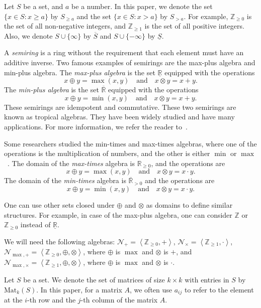 \documentclass[reqno,12pt]{amsart}
\theoremstyle{definition}
\newcommand{\Mat}{\mathrm{Mat}}
\newcommand{\ZMP}{\mathcal{N}_{\max, {+}}}
\newcommand{\ZMT}{\mathcal{N}_{\max, {\times}}}
\newcommand{\ZP}{\mathcal{N}_{+}}
\newcommand{\ZT}{\mathcal{N}_{\times}}
\begin{document}
Let $S$ be a set, and $a$ be a number. In this paper, we denote the set $\{x \in S : x \geq a\}$ by $S_{\geq a}$ and the set $\{x \in S : x > a\}$ by $S_{> a}$. For example, $\mathbb{Z}_{\geq 0}$ is the set of all non-negative integers, and $\mathbb{Z}_{\geq 1}$ is the set of all positive integers.
Also, we denote $S \cup \{\infty\}$ by $\overline{S}$ and $S \cup \{-\infty\}$ by $\underline{S}$.

A \textit{semiring} is a ring without the requirement that each element must have an additive inverse.
Two famous examples of semirings are the max-plus algebra and min-plus algebra. The \textit{max-plus algebra} is the set $\underline{\mathbb{R}}$ equipped with the operations 
$$
    x \oplus y = \max(x, y) \quad \text{and} \quad x \otimes y = x + y.
$$ 
The \textit{min-plus algebra} is the set $\overline{\mathbb{R}}$ equipped with the operations 
$$
    x \oplus y = \min(x, y) \quad \text{and} \quad  x \otimes y = x + y.
$$
These semirings are idempotent and commutative.
These two semirings are known as tropical algebras. They have been widely studied and have many applications. For more information, we refer the reader to~\cite{Butkovic2010}.

Some researchers studied the min-times and max-times algebras, where one of the operations is the multiplication of numbers, and the other is either $\min$ or $\max$~\cite{Shitov2016, SulandraIsnia2021, Durcheva2014, GaubertSergeev2008}. The domain of the \textit{max-times} algebra is $\mathbb{R}_{\geq 0}$, and the operations are 
$$
    x \oplus y = \max(x, y) \quad \text{and} \quad x \otimes y = x \cdot y.
$$
The domain of the \textit{min-times} algebra is $\overline{\mathbb{R}}_{> 0}$ and the operations are 
$$
    x \oplus y = \min(x, y) \quad \text{and} \quad x \otimes y = x \cdot y.
$$

One can use other sets closed under $\oplus$ and $\otimes$ as domains to define similar structures. For example, in case of the max-plus algebra, one can consider $\mathbb{Z}$ or $\mathbb{Z}_{\geq 0}$ instead of $\underline{\mathbb{R}}$.

We will need the following algebras: $\ZP = \left<\mathbb{Z}_{\geq 0}, {+}\right>$, $\ZT = \left<\mathbb{Z}_{\geq 1}, {\cdot}\right>$, $\ZMP = \left<\mathbb{Z}_{\geq 0}, \oplus, \otimes\right>$, where $\oplus$ is $\max$ and $\otimes$ is ${+}$, and  $\ZMT = \left<\mathbb{Z}_{\geq 1}, \oplus, \otimes\right>$, where $\oplus$ is $\max$ and $\otimes$ is ${\cdot}$.

Let $S$ be a set. We denote the set of matrices of size $k \times k$ with entries in $S$ by $\Mat_k(S)$. 
In this paper, for a matrix $A$, we often use $a_{ij}$ to refer to the element at the $i$-th row and the $j$-th column of the matrix $A$.
\end{document}
